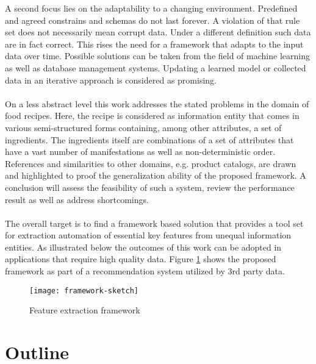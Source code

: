 A second focus lies on the adaptability to a changing environment. Predefined and agreed constrains and schemas do not last forever. A violation of that rule set does not necessarily mean corrupt data. Under a different definition such data are in fact correct. This rises the need for a framework that adapts to the input data over time. Possible solutions can be taken from the field of machine learning as well as database management systems. Updating a learned model or collected data in an iterative approach is considered as promising. 
\\\\
On a less abstract level this work addresses the stated problems in the domain of food recipes. Here, the recipe is considered as information entity that comes in various semi-structured forms containing, among other attributes, a set of ingredients. The ingredients itself are combinations of a  set of attributes that have a vast number of manifestations as well as non-deterministic order. References and similarities to other domains, e.g. product catalogs, are drawn and highlighted to proof the generalization ability of the proposed framework. A conclusion will assess the feasibility of such a system, review the performance result as well as address shortcomings.
\\\\
The overall target is to find a framework based solution that provides a tool set for extraction automation of essential key features from unequal information entities. As illustrated below the outcomes of this work can be adopted in applications that require high quality data. Figure \ref{fig:framework-sketch} shows the proposed framework as part of a recommendation system utilized by 3rd party data.
\\
\begin{figure}[htb]
  \centering
  \texttt{[image: framework-sketch]}\\
  \caption{Feature extraction framework}\label{fig:framework-sketch}
\end{figure}

\section{Outline\label{sec:outline}}

